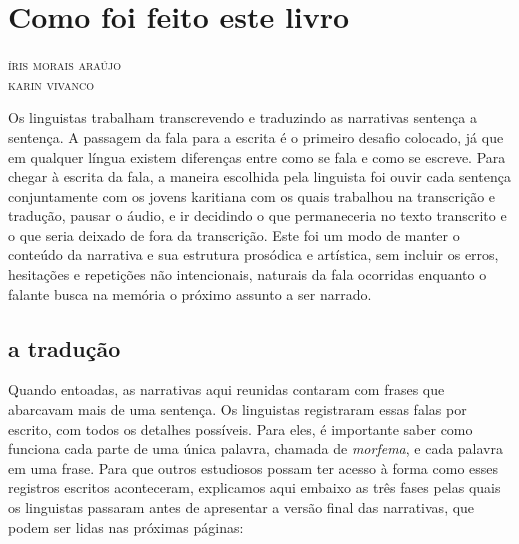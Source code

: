 
\chapter{Como foi feito este livro}

\begin{flushright}
\textsc{íris morais araújo}\\
\textsc{karin vivanco}
\end{flushright}

\noindent{}

Os linguistas trabalham transcrevendo e traduzindo as narrativas sentença a sentença. A passagem da fala para a escrita é o primeiro desafio colocado, já que em qualquer língua existem diferenças entre como se fala e como se escreve. Para chegar à escrita da fala, a maneira escolhida pela linguista foi ouvir cada sentença conjuntamente com os jovens karitiana com os quais trabalhou na transcrição e tradução, pausar o áudio, e ir decidindo o que permaneceria no texto transcrito e o que seria deixado de fora da transcrição. Este foi um modo de manter o conteúdo da narrativa e sua estrutura prosódica e artística, sem incluir os erros, hesitações e repetições não intencionais, naturais da fala ocorridas enquanto o falante busca na memória o próximo assunto a ser narrado.

\section{a tradução}

Quando entoadas, as narrativas aqui reunidas contaram com frases que abarcavam mais de uma sentença. Os linguistas registraram essas falas por escrito, com todos os detalhes possíveis. Para eles, é importante saber como funciona cada parte de uma única palavra, chamada de \textit{morfema}, e cada palavra em uma frase. Para que outros estudiosos possam ter acesso à forma como esses registros escritos aconteceram, explicamos aqui embaixo as três fases pelas quais os linguistas passaram antes de apresentar a versão final das narrativas, que podem ser lidas nas próximas páginas:

